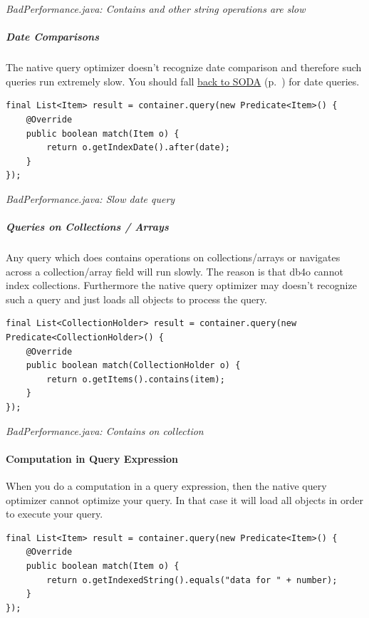 {\small\itshape BadPerformance.java: Contains and other string operations are slow\par}
\medskip

\subparagraph*{Date Comparisons}

The native query optimizer doesn't recognize date comparison and therefore such queries run extremely slow. You should fall \hyperref[ref:basics-querying-soda-soda-performance-characteristics]{back to SODA} (p.~\pageref{ref:basics-querying-soda-soda-performance-characteristics}) for date queries.

\begin{lstlisting}
final List<Item> result = container.query(new Predicate<Item>() {
    @Override
    public boolean match(Item o) {
        return o.getIndexDate().after(date);
    }
});
\end{lstlisting}

{\small\itshape BadPerformance.java: Slow date query\par}
\medskip

\subparagraph*{Queries on Collections / Arrays}

Any query which does contains operations on collections/arrays or navigates across a collection/array field will run slowly. The reason is that db4o cannot index collections. Furthermore the native query optimizer may doesn't recognize such a query and just loads all objects to process the query.

\begin{lstlisting}
final List<CollectionHolder> result = container.query(new Predicate<CollectionHolder>() {
    @Override
    public boolean match(CollectionHolder o) {
        return o.getItems().contains(item);
    }
});
\end{lstlisting}

{\small\itshape BadPerformance.java: Contains on collection\par}
\medskip

\paragraph*{Computation in Query Expression}

When you do a computation in a query expression, then the native query optimizer cannot optimize your query. In that case it will load all objects in order to execute your query.

\begin{lstlisting}
final List<Item> result = container.query(new Predicate<Item>() {
    @Override
    public boolean match(Item o) {
        return o.getIndexedString().equals("data for " + number);
    }
});
\end{lstlisting}

